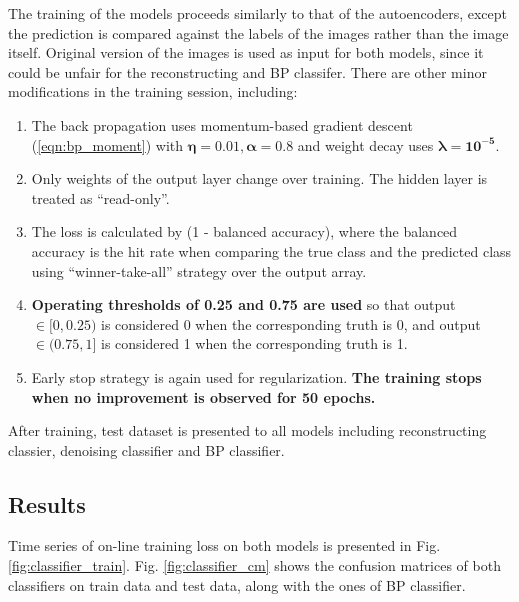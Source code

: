 \documentclass[11pt,titlepage]{article}
\begin{document}
The training of the models proceeds similarly to that of the autoencoders, except the prediction is compared against the labels of the images rather than the image itself. Original version of the images is used as input for both models, since it could be unfair for the reconstructing and BP classifer. There are other minor modifications in the training session, including:

\begin{enumerate}
	\item The back propagation uses momentum-based gradient descent (\ref{eqn:bp_moment}) with 
	$\boldsymbol{\eta = 0.01, \alpha = 0.8}$ and weight decay uses $\boldsymbol{\lambda = 10^{-5}}$.
	\item Only weights of the output layer change over training. The hidden layer is treated as ``read-only''.
	\item The loss is calculated by (1 - balanced accuracy), where the balanced accuracy is the hit rate when comparing the true class and the predicted class using ``winner-take-all'' strategy over the output array.
	\item \textbf{Operating thresholds of 0.25 and 0.75 are used} so that output $\in [0, 0.25)$ is considered 0 when the corresponding truth is 0, and output $\in (0.75, 1]$ is considered 1 when the corresponding truth is 1. 
	\item Early stop strategy is again used for regularization. \textbf{The training stops when no improvement is observed for 50 epochs. }
\end{enumerate}

After training, test dataset is presented to all models including reconstructing classier, denoising classifier and BP classifier.








\subsection{Results}
Time series of on-line training loss on both models is presented in Fig. \ref{fig:classifier_train}. Fig. \ref{fig:classifier_cm} shows the confusion matrices of both classifiers on train data and test data, along with the ones of BP classifier. 
\end{document}
